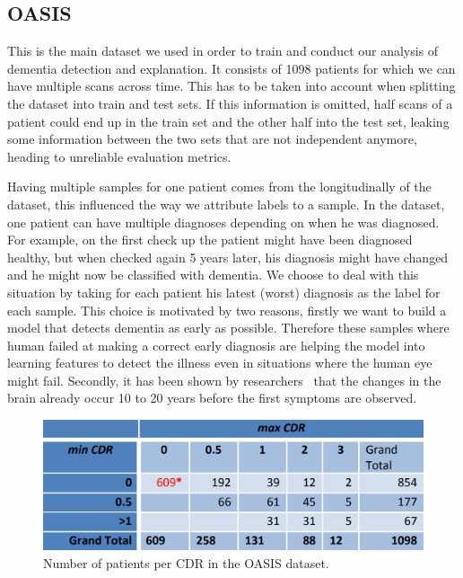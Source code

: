\subsection{OASIS}
\label{sec:OASIS}
This is the main dataset we used in order to train and conduct our analysis of dementia detection and explanation. It consists of 1098 patients for which we can have multiple scans across time. This has to be taken into account when splitting the dataset into train and test sets. If this information is omitted, half scans of a patient could end up in the train set and the other half into the test set, leaking some information between the two sets that are not independent anymore, heading to unreliable evaluation metrics.


Having multiple samples for one patient comes from the longitudinally of the dataset, this influenced the way we attribute labels to a sample. In the dataset, one patient can have multiple diagnoses depending on when he was diagnosed. For example, on the first check up the patient might have been diagnosed healthy, but when checked again 5 years later, his diagnosis might have changed and he might now be classified with dementia. We choose to deal with this situation by taking for each patient his latest (worst) diagnosis as the label for each sample. This choice is motivated by two reasons, firstly we want to build a model that detects dementia as early as possible. Therefore these samples where human failed at making a correct early diagnosis are helping the model into learning features to detect the illness even in situations where the human eye might fail. Secondly, it has been shown by researchers~\cite{change_in_brain_years_before} that the changes in the brain already occur 10 to 20 years before the first symptoms are observed.
\begin{figure}
 \centering
 \includegraphics[width=.9\linewidth]{figures/dataset/OASIS_CDR_table.png}
 \captionsetup{width=.9\linewidth}
 \caption[OASIS_CDR_table]{Number of patients per CDR in the OASIS dataset\footnotemark{}.}
 \label{fig:OASIS_CDR_table}
\end{figure}
